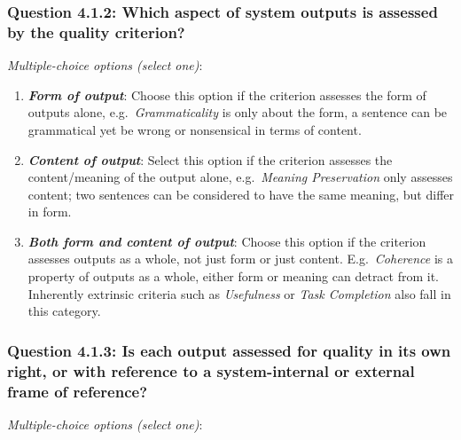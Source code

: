 \documentclass[11pt,a4paper]{article}
\newcommand{\egcvalue}[1]{\textbf{\textit{#1}}}
\begin{document}
\subsubsection*{Question 4.1.2:  Which aspect of system outputs is assessed by the quality criterion?}
\vspace{-.1cm}

\vspace{.3cm}
\noindent\textit{Multiple-choice options (select one)}:  
\vspace{-.1cm}

\begin{enumerate}[itemsep=0cm,leftmargin=0.5cm,label={\LARGE $\circ$}]
    \item \egcvalue{Form of output}: Choose this option if the criterion assesses the form of outputs alone, e.g.\ \textit{Grammaticality} is only about the form, a sentence can be grammatical yet be wrong or nonsensical in terms of content.
    \item \egcvalue{Content of output}: Select this option if the criterion assesses the content/meaning of the output alone, e.g.\ \textit{Meaning Preservation} only assesses content; two sentences can be considered to have the same meaning, but differ in form.
    \item \egcvalue{Both form and content of output}: Choose this option if the criterion assesses outputs as a whole, not just form or just content. E.g.\ \textit{Coherence} is a property of outputs as a whole, either form or meaning can detract from it. Inherently extrinsic criteria such as \textit{Usefulness} or \textit{Task Completion} also fall in this category.
\end{enumerate}


\subsubsection*{Question 4.1.3: Is each output assessed for quality in its own right, or with reference to a system-internal or external frame of reference?}

\noindent\textit{Multiple-choice options (select one)}:  
\vspace{-.1cm}
\end{document}
